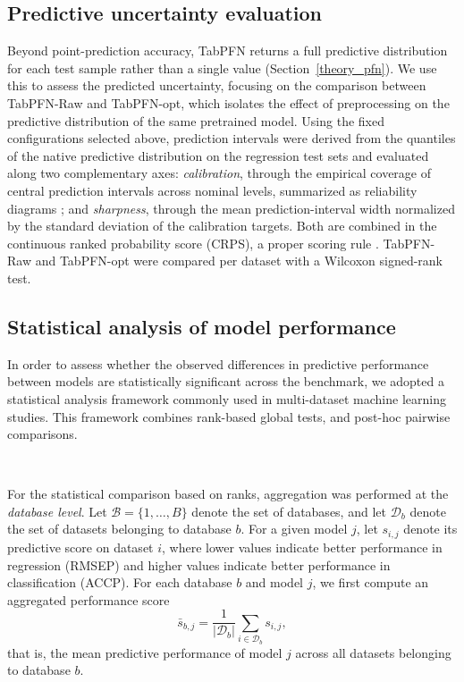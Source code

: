\documentclass{article}
\begin{document}
\subsection{Predictive uncertainty evaluation} \label{sec:uncertainty}

Beyond point-prediction accuracy, TabPFN returns a full predictive distribution for each test sample rather than a single value (Section~\ref{theory_pfn}). We use this to assess the predicted uncertainty, focusing on the comparison between TabPFN-Raw and TabPFN-opt, which isolates the effect of preprocessing on the predictive distribution of the same pretrained model. Using the fixed configurations selected above, prediction intervals were derived from the quantiles of the native predictive distribution on the regression test sets and evaluated along two complementary axes: \emph{calibration}, through the empirical coverage of central prediction intervals across nominal levels, summarized as reliability diagrams \cite{kuleshov_accurate_2018}; and \emph{sharpness}, through the mean prediction-interval width normalized by the standard deviation of the calibration targets. Both are combined in the continuous ranked probability score (CRPS), a proper scoring rule \cite{gneiting_strictly_2007}. TabPFN-Raw and TabPFN-opt were compared per dataset with a Wilcoxon signed-rank test.


\subsection{Statistical analysis of model performance}

In order to assess whether the observed differences in predictive performance between models are statistically significant across the benchmark, we adopted a statistical analysis framework commonly used in multi-dataset machine learning studies. This framework combines rank-based global tests, and post-hoc pairwise comparisons.

~

For the statistical comparison based on ranks, aggregation was performed at the \emph{database level}. Let $\mathcal{B}=\{1,\dots,B\}$ denote the set of databases, and let $\mathcal{D}_b$ denote the set of datasets belonging to database $b$. For a given model $j$, let $s_{i,j}$ denote its predictive score on dataset $i$, where lower values indicate better performance in regression (RMSEP) and higher values indicate better performance in classification (ACCP). For each database $b$ and model $j$, we first compute an aggregated performance score
\[
\bar{s}_{b,j} =
\frac{1}{|\mathcal{D}_b|}
\sum_{i \in \mathcal{D}_b} s_{i,j},
\]
that is, the mean predictive performance of model $j$ across all datasets belonging to database $b$.
\end{document}
